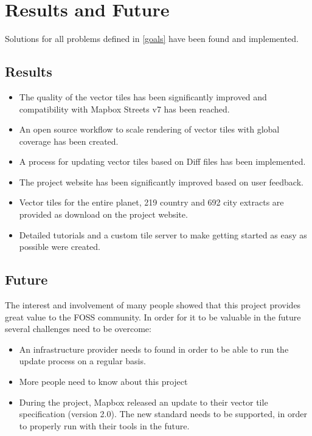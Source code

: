 \chapter{Results and Future}\label{part1_results_and_future}

Solutions for all problems defined in \autoref{goals} have been found and implemented.

\section{Results}\label{part1_results}

\begin{itemize}
    \item The quality of the vector tiles has been significantly improved and compatibility with Mapbox Streets v7 has been reached.
    \item An open source workflow to scale rendering of vector tiles with global coverage has been created.
    \item A process for updating vector tiles based on \osm{} Diff files has been implemented.
    \item The project website has been significantly improved based on user feedback.
    \item Vector tiles for the entire planet, 219 country and 692 city extracts are provided as download on the project website.
    \item Detailed tutorials and a custom tile server to make getting started as easy as possible were created.
\end{itemize}

\section{Future}\label{part1_future}

The interest and involvement of many people showed that this project provides great value to the FOSS community. In order for it to be valuable in the future several challenges need to be overcome:

\begin{itemize}
    \item An infrastructure provider needs to found in order to be able to run the update process on a regular basis.
    \item More people need to know about this project
    \item During the project, Mapbox released an update to their vector tile specification (version 2.0). The new standard needs to be supported, in order to properly run with their tools in the future.
\end{itemize}

